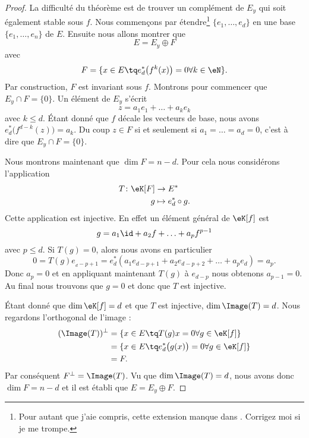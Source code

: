 \begin{proof}
    La difficulté du théorème est de trouver un complément de \( E_y\) qui soit également stable sous \( f\). Nous commençons par étendre\footnote{Pour autant que j'aie compris, cette extension manque dans \cite{AutourFrobCompa}. Corrigez moi si je me trompe.} \( \{ e_1,\ldots, e_d \}\) en une base \( \{ e_1,\ldots, e_n \}\) de \( E\). Ensuite nous allons montrer que
    \begin{equation}
        E=E_y\oplus F
    \end{equation}
    avec
    \begin{equation}
        F=\{ x\in E\tq  e^*_d\big( f^k(x) \big)=0\forall k\in \eN \}.
    \end{equation}
    Par construction, \( F\) est invariant sous \( f\). Montrons pour commencer que \( E_y\cap F=\{ 0 \}\). Un élément de \( E_y\) s'écrit
    \begin{equation}
        z=a_1e_1+\ldots +a_ke_k
    \end{equation}
    avec \( k\leq d\). Étant donné que \( f\) décale les vecteurs de base, nous avons \( e^*_d\big( f^{d-k}(z) \big)=a_k\). Du coup \( z\in F\) si et seulement si \( a_1=\ldots=a_d=0\), c'est à dire que \( E_y\cap F=\{ 0 \}\).

    Nous montrons maintenant que \( \dim F=n-d\). Pour cela nous considérons l'application
    \begin{equation}
        \begin{aligned}
            T\colon \eK[F]&\to E^* \\
            g&\mapsto e^*_d\circ g. 
        \end{aligned}
    \end{equation}
    Cette application est injective. En effet un élément général de \( \eK[f]\) est
    \begin{equation}
        g=a_1\id+a_2f+\ldots +a_pf^{p-1}
    \end{equation}
    avec \( p\leq d\). Si \( T(g)=0\), alors nous avons en particulier
    \begin{equation}
        0=T(g)e_{_d-p+1}=e^*_d(a_1e_{d-p+1}+a_2e_{d-p+2}+\ldots +a_pe_d)=a_p.
    \end{equation}
    Donc \( a_p=0\) et en appliquant maintenant \( T(g)\) à \( e_{d-p}\) nous obtenons \( a_{p-1}=0\). Au final nous trouvons que \( g=0\) et donc que \( T\) est injective.

    Étant donné que \( \dim\eK[f]=d\) et que \( T\) est injective, \( \dim\Image(T)=d\). Nous regardons l'orthogonal de l'image :
    \begin{subequations}
        \begin{align}
            (\Image(T))^{\perp}&=\{ x\in E\tq T(g)x=0\forall g\in\eK[f] \}\\
            &=\{ x\in E\tq e^*_d\big( g(x) \big)=0\forall g\in \eK[f] \}\\
            &=F.
        \end{align}
    \end{subequations}
    Par conséquent \( F^{\perp}=\Image(T)\). Vu que \( \dim\Image(T)=d\), nous avons donc \( \dim F=n-d\) et il est établi que \( E=E_y\oplus F\). 


\end{proof}

